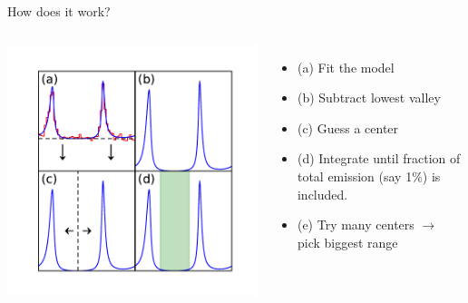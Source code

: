 \documentclass[12pt]{beamer}
\begin{document}
\begin{frame}{How does it work?}

\begin{columns}
  \includegraphics[width=1\textwidth]{plots/find_off_pulse.pdf}
  \begin{itemize}
    \item (a) Fit the model
    \item (b) Subtract lowest valley
    \item (c) Guess a center
    \item (d) Integrate until fraction of total emission (say 1\%) is included.
    \item (e) Try many centers $\rightarrow$ pick biggest range
  \end{itemize}
\end{columns}
\end{frame}
\end{document}
